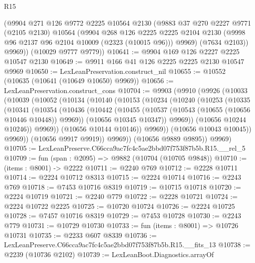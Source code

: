 \begin{lexlean}{R15}
\begin{coremodule}
        (@9904
          @271
          @126
          @9772
          @2225
          @10564
          @2130
          (@9883
            @37
            @270
            @2227
            @9771
            (@2105 @2130)
            @10564
            (@9904
              @268
              @126
              @2225
              @2225
              @2104
              @2130
              (@9998 @96 @2137 @96 @2104 @10009 (@2323 (@10015 @96)))
              @9969)
            (@7634 @2103))
          @9969))
      (@10029 @9777 @9779))
@10641 := @9904 @169 @126 @2227 @2225 @10547 @2130
@10649 := @9911 @166 @41 @126 @2225 @2225 @2130 @10547 @9969
@10650 := LexLeanPreservation.construct_nil
@10655 := @10552 (@10635 (@10641 (@10649 @10650) @9969))
@10656 := LexLeanPreservation.construct_cons
@10704 := @9903
    (@9910
      (@9926
        (@10033
          (@10039
            (@10052
              (@10134
                (@10140
                  (@10153
                    (@10234
                      (@10240
                        (@10253
                          (@10335
                            (@10341
                              (@10354
                                (@10436
                                  (@10442
                                    (@10455
                                      (@10537 (@10543 (@10655 (@10656 @10446 @10448)) @9969))
                                      (@10656 @10345 @10347))
                                    @9969))
                                (@10656 @10244 @10246))
                              @9969))
                          (@10656 @10144 @10146))
                        @9969))
                    (@10656 @10043 @10045))
                  @9969))
              (@10656 @9917 @9919))
            @9969))
        (@10656 @9889 @9895))
      @9969)
@10705 := LexLeanPreserve.C66cca9ac7fc4c5ae2bbd07f753f87b5b.R15.__rel_5
@10709 := fun (span : @2095) => @9882 (@10704 (@10705 @9848))
@10710 := (items : @8001) -> @2222
@10711 := @2240 @769
@10712 := @2228 @10711
@10714 := @2224 @10712 @8313
@10715 := @2224 @10714
@10716 := @2243 @769
@10718 := @7453 @10716 @8319
@10719 := @10715 @10718
@10720 := @2224 @10719
@10721 := @2240 @779
@10722 := @2228 @10721
@10724 := @2224 @10722 @2225
@10725 := @10720 @10724
@10726 := @2224 @10725
@10728 := @7457 @10716 @8319
@10729 := @7453 @10728
@10730 := @2243 @779
@10731 := @10729 @10730
@10733 := fun (items : @8001) => @10726 @10731
@10735 := @2233 @607 @8339
@10736 := LexLeanPreserve.C66cca9ac7fc4c5ae2bbd07f753f87b5b.R15.__fits_13
@10738 := @2239 (@10736 @2102)
@10739 := LexLeanBoot.Diagnostics.arrayOf

\end{coremodule}
\end{lexlean}
